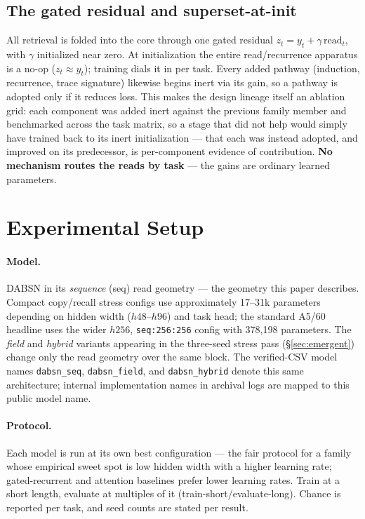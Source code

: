 \documentclass[11pt]{article}
\newcommand{\model}{DABSN}
\begin{document}
\subsection{The gated residual and superset-at-init}
\label{sec:residual}

All retrieval is folded into the core through one gated residual
$z_t = y_t + \gamma\,\mathrm{read}_t$, with $\gamma$ initialized near zero.
At initialization the entire read/recurrence apparatus is a
no-op ($z_t \approx y_t$); training dials it in per task. Every added pathway
(induction, recurrence, trace signature) likewise begins inert via its gain,
so a pathway is adopted only if it reduces loss. This makes the design
lineage itself an ablation grid: each component was added inert against the
previous family member and benchmarked across the task matrix, so a stage
that did not help would simply have trained back to its inert initialization
--- that each was instead adopted, and improved on its predecessor, is
per-component evidence of contribution. \textbf{No mechanism routes the
reads by task} --- the gains are ordinary learned parameters.

\section{Experimental Setup}
\label{sec:setup}

\paragraph{Model.} \model{} in its \emph{sequence} (seq) read geometry ---
the geometry this paper describes. Compact copy/recall stress configs use
approximately 17--31k parameters depending on hidden width ($h48$--$h96$)
and task head; the standard A5/60 headline uses the wider $h256$,
\texttt{seq:256:256} config with 378{,}198 parameters. The \emph{field} and
\emph{hybrid} variants appearing in the three-seed stress pass
(\S\ref{sec:emergent}) change only the read geometry over the same block. The
verified-CSV model names \texttt{dabsn\_seq}, \texttt{dabsn\_field}, and
\texttt{dabsn\_hybrid} denote this same architecture; internal implementation
names in archival logs are mapped to this public model name.

\paragraph{Protocol.} Each model is run at its own best configuration --- the
fair protocol for a family whose empirical sweet spot is low hidden width
with a higher learning rate; gated-recurrent and attention baselines prefer
lower learning rates. Train at a short length, evaluate at multiples of it
(train-short/evaluate-long). Chance is reported per task, and seed counts are
stated per result.
\end{document}
